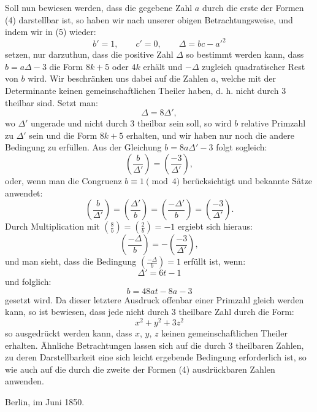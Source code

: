 \documentclass[11pt]{article}
\newcommand{\leg}[2]{\left(\frac{#1}{#2}\right)}
\begin{document}
Soll nun bewiesen werden, dass die gegebene Zahl $a$ durch die erste der Formen (4) darstellbar ist, so haben wir nach unserer obigen Betrachtungsweise, und indem wir in (5) wieder:
\[
 b'=1,\qquad c'=0,\qquad \Delta=bc-a'^2
\]
setzen, nur darzuthun, dass die positive Zahl $\Delta$ so bestimmt werden kann, dass $b=a\Delta-3$ die Form $8k+5$ oder $4k$ erhält und $-\Delta$ zugleich quadratischer Rest von $b$ wird. Wir beschränken uns dabei auf die Zahlen $a$, welche mit der Determinante keinen gemeinschaftlichen Theiler haben, d. h. nicht durch $3$ theilbar sind. Setzt man:
\[
 \Delta=8\Delta',
\]
wo $\Delta'$ ungerade und nicht durch $3$ theilbar sein soll, so wird $b$ relative Primzahl zu $\Delta'$ sein und die Form $8k+5$ erhalten, und wir haben nur noch die andere Bedingung zu erfüllen. Aus der Gleichung $b=8a\Delta'-3$ folgt sogleich:
\[
 \leg{b}{\Delta'}=\leg{-3}{\Delta'},
\]
oder, wenn man die Congruenz $b\equiv1\pmod 4$ berücksichtigt und bekannte Sätze anwendet:
\[
 \leg{b}{\Delta'}=\leg{\Delta'}{b}=\leg{-\Delta'}{b}=\leg{-3}{\Delta'}.
\]
Durch Multiplication mit $\leg{8}{b}=\leg{2}{b}=-1$ ergiebt sich hieraus:
\[
 \leg{-\Delta}{b}=-\leg{-3}{\Delta'},
\]
und man sieht, dass die Bedingung $\leg{-\Delta}{b}=1$ erfüllt ist, wenn:
\[
 \Delta'=6t-1
\]
und folglich:
\[
 b=48at-8a-3
\]
gesetzt wird. Da dieser letztere Ausdruck offenbar einer Primzahl gleich werden kann, so ist bewiesen, dass jede nicht durch $3$ theilbare Zahl durch die Form:
\[
 x^2+y^2+3z^2
\]
so ausgedrückt werden kann, dass $x$, $y$, $z$ keinen gemeinschaftlichen Theiler erhalten. Ähnliche Betrachtungen lassen sich auf die durch $3$ theilbaren Zahlen, zu deren Darstellbarkeit eine sich leicht ergebende Bedingung erforderlich ist, so wie auch auf die durch die zweite der Formen (4) ausdrückbaren Zahlen anwenden.

\begin{flushright}
Berlin, im Juni 1850.
\end{flushright}
\end{document}

